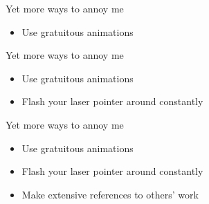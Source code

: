 \documentclass[12pt]{article}
\newcommand{\headsize}{\fontsize{35}{35} \selectfont}
\newcommand{\smallsize}{\fontsize{25}{30} \selectfont}
\begin{document}
\newpage

\headsize \color{myyellow}
\hfill \begin{minipage}{6.25in}
\centering
Yet more ways to annoy me
\end{minipage}

\vspace{30mm} \color{mywhite} \smallsize

\hfill \begin{minipage}{9.5in}

\begin{itemize}
\itemsep18pt

\item Use gratuitous animations


\end{itemize}

\end{minipage}

\newpage

\headsize \color{myyellow}
\hfill \begin{minipage}{6.25in}
\centering
Yet more ways to annoy me
\end{minipage}

\vspace{30mm} \color{mywhite} \smallsize

\hfill \begin{minipage}{9.5in}

\begin{itemize}
\itemsep18pt

\item Use gratuitous animations

\item Flash your laser pointer around constantly 


\end{itemize}

\end{minipage}


\newpage

\headsize \color{myyellow}
\hfill \begin{minipage}{6.25in}
\centering
Yet more ways to annoy me
\end{minipage}

\vspace{30mm} \color{mywhite} \smallsize

\hfill \begin{minipage}{9.5in}

\begin{itemize}
\itemsep18pt

\item Use gratuitous animations

\item Flash your laser pointer around constantly 

\item Make extensive references to others' work


\end{itemize}

\end{minipage}
\end{document}

